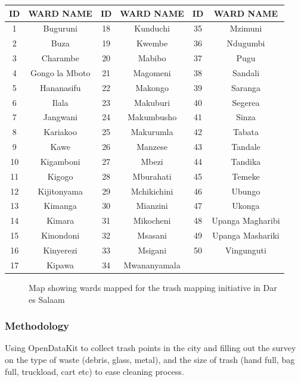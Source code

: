 \documentclass[a4paper,12pt,twoside]{article}
\begin{document}
\begin{center}
\begin{tabular}{|c|c|c|c|c|c|}
\hline
ID & WARD NAME & ID & WARD NAME & ID & WARD NAME\\
\hline
1 & Buguruni & 18 & Kunduchi & 35 & Mzimuni\\
2 & Buza & 19 & Kwembe & 36 & Ndugumbi\\
3 & Charambe & 20 & Mabibo & 37 & Pugu\\
4 & Gongo la Mboto & 21 & Magomeni & 38 & Sandali\\
5 & Hananasifu & 22 & Makongo & 39 & Saranga\\
6 & Ilala & 23 & Makuburi & 40 & Segerea\\
7 & Jangwani & 24 & Makumbusho & 41 & Sinza\\
8 & Kariakoo & 25 & Makurumla & 42 & Tabata\\
9 & Kawe & 26 & Manzese & 43 & Tandale\\
10 & Kigamboni & 27 & Mbezi & 44 & Tandika\\
11 & Kigogo & 28 & Mburahati & 45 & Temeke\\
12 & Kijitonyama & 29 & Mchikichini & 46 & Ubungo\\
13 & Kimanga & 30 & Mianzini & 47 & Ukonga\\
14 & Kimara & 31 & Mikocheni & 48 & Upanga Magharibi\\
15 & Kinondoni & 32 & Msasani & 49 & Upanga Mashariki\\
16 & Kinyerezi & 33 & Msigani & 50 & Vingunguti\\
17 & Kipawa & 34 & Mwananyamala & {} & {}\\
 \hline
\end{tabular}
\end{center}

\begin{figure}[h]
  \caption{Map showing wards mapped for the trash mapping initiative in Dar es Salaam}
  \centering
\end{figure}

\subsubsection{Methodology}
Using OpenDataKit to collect trash points in the city and filling out the survey on the type of waste (debris, glass, metal), and the size of trash (hand full, bag full, truckload, cart etc) to ease cleaning process.
\end{document}
